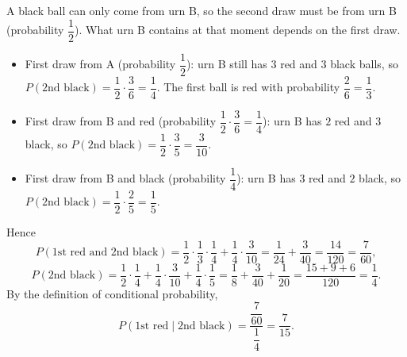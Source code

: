 A black ball can only come from urn B, so the second draw must be from urn B (probability $\dfrac{1}{2}$). What urn B contains at that moment depends on the first draw.
\begin{itemize}
\item First draw from A (probability $\dfrac{1}{2}$): urn B still has $3$ red and $3$ black balls, so $P(\text{2nd black})=\dfrac{1}{2}\cdot\dfrac{3}{6}=\dfrac{1}{4}$. The first ball is red with probability $\dfrac{2}{6}=\dfrac{1}{3}$.
\item First draw from B and red (probability $\dfrac{1}{2}\cdot\dfrac{3}{6}=\dfrac{1}{4}$): urn B has $2$ red and $3$ black, so $P(\text{2nd black})=\dfrac{1}{2}\cdot\dfrac{3}{5}=\dfrac{3}{10}$.
\item First draw from B and black (probability $\dfrac{1}{4}$): urn B has $3$ red and $2$ black, so $P(\text{2nd black})=\dfrac{1}{2}\cdot\dfrac{2}{5}=\dfrac{1}{5}$.
\end{itemize}
Hence
\[
P(\text{1st red and 2nd black})=\dfrac{1}{2}\cdot\dfrac{1}{3}\cdot\dfrac{1}{4}+\dfrac{1}{4}\cdot\dfrac{3}{10}=\dfrac{1}{24}+\dfrac{3}{40}=\dfrac{14}{120}=\dfrac{7}{60},
\]
\[
P(\text{2nd black})=\dfrac{1}{2}\cdot\dfrac{1}{4}+\dfrac{1}{4}\cdot\dfrac{3}{10}+\dfrac{1}{4}\cdot\dfrac{1}{5}=\dfrac{1}{8}+\dfrac{3}{40}+\dfrac{1}{20}=\dfrac{15+9+6}{120}=\dfrac{1}{4} .
\]
By the definition of conditional probability,
\[
P(\text{1st red}\mid\text{2nd black})=\dfrac{\dfrac{7}{60}}{\dfrac{1}{4}}=\boxed{\dfrac{7}{15}}.
\]
